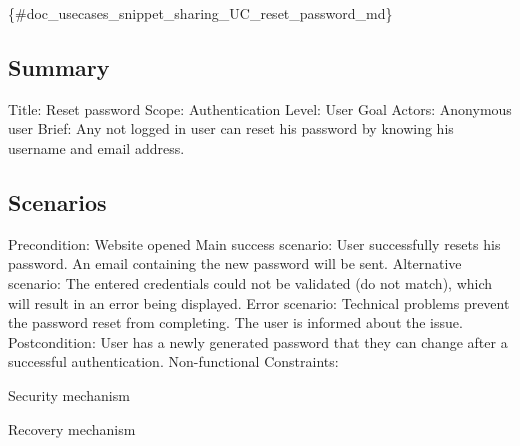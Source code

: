 \{\#doc\+\_\+usecases\+\_\+snippet\+\_\+sharing\+\_\+\+U\+C\+\_\+reset\+\_\+password\+\_\+md\}

\subsection*{Summary}

Title\+: Reset password Scope\+: Authentication Level\+: User Goal Actors\+: Anonymous user Brief\+: Any not logged in user can reset his password by knowing his username and email address.

\subsection*{Scenarios}

Precondition\+: Website opened Main success scenario\+: User successfully resets his password. An email containing the new password will be sent. Alternative scenario\+: The entered credentials could not be validated (do not match), which will result in an error being displayed. Error scenario\+: Technical problems prevent the password reset from completing. The user is informed about the issue. Postcondition\+: User has a newly generated password that they can change after a successful authentication. Non-\/functional Constraints\+:
\begin{DoxyItemize}
\item Security mechanism
\item Recovery mechanism 
\end{DoxyItemize}